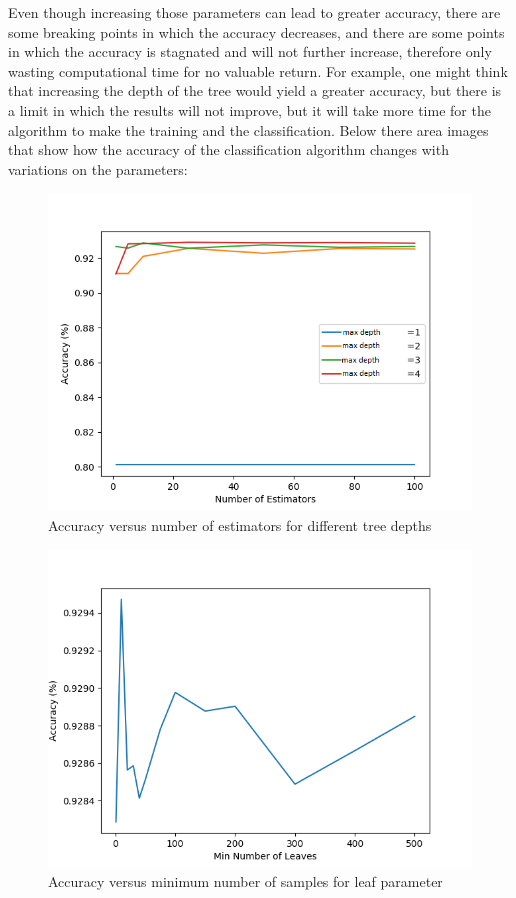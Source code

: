 Even though increasing those parameters can lead to greater accuracy, there are some breaking points in which the accuracy decreases, and there are some points in which the accuracy is stagnated and will not further increase, therefore only wasting computational time for no valuable return. For example, one might think that increasing the depth of the tree would yield a greater accuracy, but there is a limit in which the results will not improve, but it will take more time for the algorithm to make the training and the classification.
Below there area images that show how the accuracy of the classification algorithm changes with variations on the parameters:
\begin{figure}[H]
    \centering
    \includegraphics[width=\linewidth]{Chapter5/Number_of_estimators.png}
    \caption{Accuracy versus number of estimators for different tree depths}
    \label{fig:num_estimators}
\end{figure}{}

\begin{figure}[H]
    \centering
    \includegraphics[width=\linewidth]{Chapter5/number_of_leaves.png}
    \caption{Accuracy versus minimum number of samples for leaf parameter}
    \label{fig:num_leaves}
\end{figure}{}
